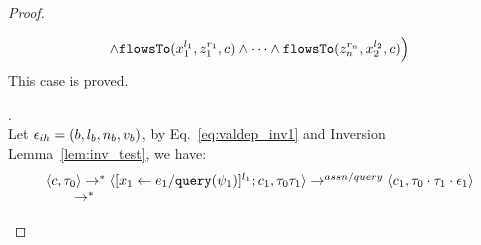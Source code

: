 \begin{proof}
\begin{case}[$\trace_2 = \trace_{ih} \cdot \event_{ih}$]
\begin{subcase}
\begin{subsubcase}
\begin{subsubsubcase}
\[ \land \mathtt{flowsTo}(x_1^{l_1}, z_1^{r_1}, c) \land \cdots \land \mathtt{flowsTo}(z_n^{r_n}, {x}_2^{l_2}, c) \Big)
\]
This case is proved.
%
%
\end{subsubsubcase}
\end{subsubcase}
\end{subcase}
%
\begin{subcase}.
\label{case:valdep_ihtest}
 \\
Let $\mathtt{\epsilon}_{ih} = (b, l_b, n_b, v_b)$, by Eq.~\ref{eq:valdep_inv1} and {Inversion Lemma~\ref{lem:inv_test}}, we have:
\begin{equation}
\label{eq:m1test_inv1}
  \begin{array}{l}   
\langle {c}, \mathtt{\tau}_0 \rangle \rightarrow^{*} 
\langle [\mathrel{ {x}_1 \leftarrow e_1 / {\tt query}(\psi_1) }]^{l_1} ; {c}_1, \mathtt{\tau}_0 \mathtt{\tau}_1 \rangle  
\rightarrow^{assn/query}
 \langle c_1, \mathtt{\tau}_0 \cdot \mathtt{\tau}_1 \cdot \mathtt{\epsilon}_1 \rangle 
 \\
  \qquad \rightarrow^{*} 

\end{array}
\end{equation}
\end{subcase}
\end{case}
\end{proof}
